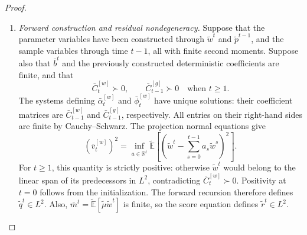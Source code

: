 \begin{proof}
\begin{enumerate}[wide]
            \item \emph{Forward construction and residual nondegeneracy.}
            Suppose that the parameter variables have been constructed
            through $\tilde w^t$ and $\tilde p^{t-1}$, and the sample
            variables through time $t-1$, all with finite second moments.
            Suppose also that $\bar b^t$ and the previously constructed
            deterministic coefficients are finite, and that
            \[
                \bar C_t^{[w]}\succ0,
                \qquad
                \bar C_{t-1}^{[g]}\succ0
                \quad\text{when }t\geq1.
            \]
            The systems defining $\bar\alpha_t^{[w]}$ and
            $\bar\phi_t^{[w]}$ have unique solutions:
            their coefficient matrices are
            $\bar C_{t-1}^{[w]}$ and $\bar C_{t-1}^{[g]}$,
            respectively.
            All entries on their right-hand sides are finite
            by Cauchy--Schwarz.
            The projection normal equations give
            \[
                (\bar v_t^{[w]})^2
                =
                \inf_{a\in\mathbb R^t}
                \tilde{\mathbb E}
                \left[
                    \left(
                        \tilde w^t-\sum_{s=0}^{t-1}a_s\tilde w^s
                    \right)^2
                \right].
            \]
            For $t\geq1$, this quantity is strictly positive:
            otherwise $\tilde w^t$ would belong to the linear span
            of its predecessors in $L^2$, contradicting
            $\bar C_t^{[w]}\succ0$.
            Positivity at $t=0$ follows from the initialization.
            The forward recursion therefore defines $\tilde q^t\in L^2$.
            Also,
            $\bar m^t=\tilde{\mathbb E}[\tilde\mu\tilde w^t]$
            is finite, so the score equation defines $\tilde r^t\in L^2$.
        

\end{enumerate}
\end{proof}
